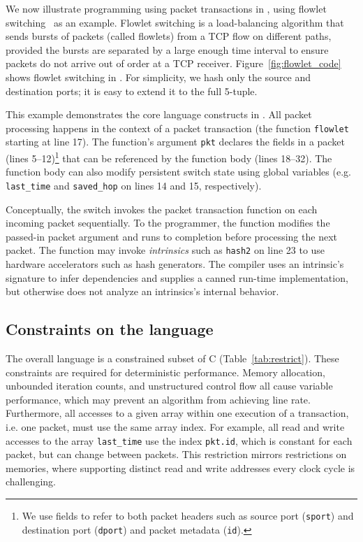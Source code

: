 We now illustrate programming using packet transactions in \pktlanguage, using
flowlet switching~\cite{flowlets} as an example. Flowlet switching is a
load-balancing algorithm that sends bursts of packets (called flowlets) from a
TCP flow on different paths, provided the bursts are separated by a large
enough time interval to ensure packets do not arrive out of order at a TCP
receiver. Figure~\ref{fig:flowlet_code} shows flowlet switching in
\pktlanguage. For simplicity, we hash only the source and destination ports; it
is easy to extend it to the full 5-tuple.

This example demonstrates the core language constructs in \pktlanguage. All
packet processing happens in the context of a packet transaction (the function
\texttt{flowlet} starting at line 17). The function's argument {\tt pkt}
declares the fields in a packet (lines 5--12)\footnote{We use fields to refer
to both packet headers such as source port ({\tt sport}) and destination port
({\tt dport}) and packet metadata ({\tt id}).} that can be referenced by the
function body (lines 18--32).  The function body can also modify persistent
switch state using global variables (e.g.  \texttt{last\_time} and
\texttt{saved\_hop} on lines 14 and 15, respectively).

Conceptually, the switch invokes the packet transaction function on each
incoming packet sequentially. To the programmer, the function modifies the
passed-in packet argument and runs to completion before processing the next
packet.  The function may invoke \textit{intrinsics} such as \texttt{hash2} on
line 23 to use hardware accelerators such as hash generators.  The \pktlanguage
compiler uses an intrinsic's signature to infer dependencies and supplies a
canned run-time implementation, but otherwise does not analyze an intrinsics's
internal behavior.

\subsection{Constraints on the language}

The overall language is a constrained subset of C
(Table~\ref{tab:restrict}).  These constraints are required for
deterministic performance.  Memory allocation, unbounded iteration
counts, and unstructured control flow all cause variable performance,
which may prevent an algorithm from achieving line rate.
Furthermore, all accesses to a given array within one execution of a
transaction, i.e. one packet, must use the same array index. For
example, all read and write accesses to the array \texttt{last\_time}
use the index \texttt{pkt.id}, which is constant for each packet, but
can change between packets. This restriction mirrors restrictions on
memories, where supporting distinct read and write addresses every
clock cycle is challenging.

